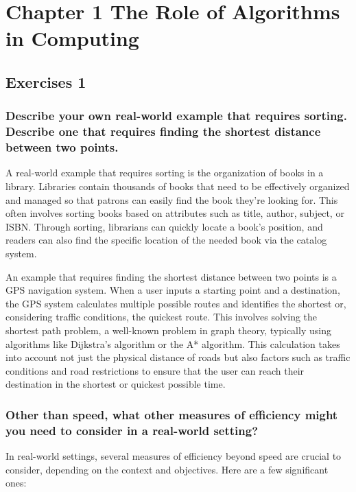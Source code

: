 \section{Chapter 1 The Role of Algorithms in Computing}\label{sec:Chapter 1 The Role of Algorithms in Computing}

\subsection{Exercises 1} 

\subsubsection{Describe your own real-world example that requires sorting. Describe one that requires finding the shortest distance between two points.}

A real-world example that requires sorting is the organization of books in a library. Libraries contain thousands of books that need to be effectively organized and managed so that patrons can easily find the book they're looking for. This often involves sorting books based on attributes such as title, author, subject, or ISBN. Through sorting, librarians can quickly locate a book's position, and readers can also find the specific location of the needed book via the catalog system.

An example that requires finding the shortest distance between two points is a GPS navigation system. When a user inputs a starting point and a destination, the GPS system calculates multiple possible routes and identifies the shortest or, considering traffic conditions, the quickest route. This involves solving the shortest path problem, a well-known problem in graph theory, typically using algorithms like Dijkstra's algorithm or the A* algorithm. This calculation takes into account not just the physical distance of roads but also factors such as traffic conditions and road restrictions to ensure that the user can reach their destination in the shortest or quickest possible time.

\subsubsection{Other than speed, what other measures of efficiency might you need to consider in a real-world setting?}

In real-world settings, several measures of efficiency beyond speed are crucial to consider, depending on the context and objectives. Here are a few significant ones:

